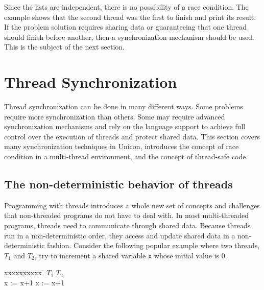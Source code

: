 Since the lists are independent, there is no possibility of a race
condition. The example shows that the second thread was the first to
finish and print its result. If the problem solution requires sharing
data or guaranteeing that one thread should finish before another,
then a synchronization mechanism should be used. This is the subject
of the next section.


\section{Thread Synchronization}

Thread synchronization can be done in many different ways. Some
problems require more synchronization than others. Some may require
advanced synchronization mechanisms and rely on the language support
to achieve full control over the execution of threads and protect
shared data. This section covers many synchronization techniques in
Unicon, introduces the concept of race condition in a multi-thread
environment, and the concept of thread-safe code.

\subsection{The non-deterministic behavior of threads}

Programming with threads introduces a whole new set of concepts and
challenges that non-threaded programs do not have to deal with.  In
most multi-threaded programs, threads need to communicate through
shared data. Because threads run in a non-deterministic order, they
access and update shared data in a non-deterministic fashion.
Consider the following popular example where two threads, $T_1$ and
$T_2$, try to increment a shared variable \texttt{x} whose initial
value is 0.

\begin{tabbing}
  xxxxxxxxxx \= \kill
  $T_1$ \> $T_2$ \\
  x := x+1 \> x := x+1
\end{tabbing}

